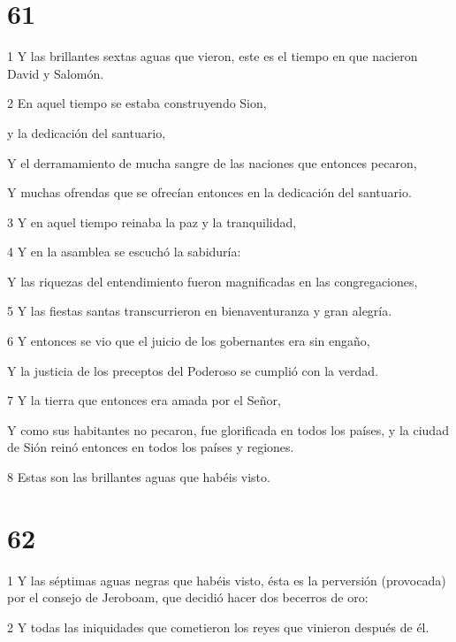 \chapter{61}

\par 1 Y las brillantes sextas aguas que vieron, este es el tiempo en que nacieron David y Salomón.

\par 2 En aquel tiempo se estaba construyendo Sion,

\par y la dedicación del santuario,

Y el derramamiento de mucha sangre de las naciones que entonces pecaron,

Y muchas ofrendas que se ofrecían entonces en la dedicación del santuario.

\par 3 Y en aquel tiempo reinaba la paz y la tranquilidad,

\par 4 Y en la asamblea se escuchó la sabiduría:

Y las riquezas del entendimiento fueron magnificadas en las congregaciones,

\par 5 Y las fiestas santas transcurrieron en bienaventuranza y gran alegría.

\par 6 Y entonces se vio que el juicio de los gobernantes era sin engaño,

Y la justicia de los preceptos del Poderoso se cumplió con la verdad.

\par 7 Y la tierra que entonces era amada por el Señor,

Y como sus habitantes no pecaron, fue glorificada en todos los países, y la ciudad de Sión reinó entonces en todos los países y regiones.

\par 8 Estas son las brillantes aguas que habéis visto.

\chapter{62}

\par 1 Y las séptimas aguas negras que habéis visto, ésta es la perversión (provocada) por el consejo de Jeroboam, que decidió hacer dos becerros de oro:

\par 2 Y todas las iniquidades que cometieron los reyes que vinieron después de él.

